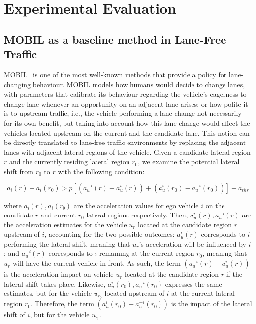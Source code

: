 \section{Experimental Evaluation}\label{sec:exp_eval2}



\subsection{MOBIL as a baseline method in Lane-Free Traffic}

MOBIL~\cite{kesting2007mobil} is one of the most well-known  methods that provide a policy for lane-changing behaviour.
MOBIL models how humans would decide to change lanes, with parameters that calibrate its behaviour regarding the vehicle's eagerness to change lane whenever an opportunity on an adjacent lane arises; or how polite it is to upstream traffic, i.e., the vehicle performing a lane change not necessarily for its own benefit, but taking into account how this lane-change would affect the vehicles located upstream on the current and the candidate lane.
This notion can be directly translated to lane-free traffic environments by replacing the adjacent lanes with adjacent lateral regions of the vehicle. 
Given a candidate lateral region $r$ and the currently residing lateral region $r_0$, we examine the potential lateral shift from $r_0$ to $r$ with the following condition:

\begin{equation}\label{eq:mobil}
    a_i(r) - a_i(r_0) > p [(a_u^{-i}(r)-a_u^i(r))+(a_u^i(r_0)-a_u^{-i}(r_0))]+ a_{thr}
\end{equation}

\noindent where $a_i(r), a_i(r_0)$ are the acceleration values for ego vehicle $i$ on the candidate $r$ and current $r_0$ lateral regions respectively. Then, $a_u^i(r),a_u^{-i}(r)$ are the acceleration estimates for the vehicle $u_r$ located at the candidate region $r$ upstream of $i$, accounting for the two possible outcomes: $a_u^i(r)$ corresponds to $i$ performing the lateral shift, meaning that $u_r$'s acceleration will be influenced by $i$; and $a_u^{-i}(r)$ corresponds to $i$ remaining at the current region $r_0$, meaning that $u_r$ will have the current vehicle in front.
As such, the term $(a_u^{-i}(r)-a_u^i(r))$ is the acceleration impact on vehicle $u_r$ located at the candidate region $r$ if the lateral shift takes place.
Likewise, $a_u^i(r_0),a_u^{-i}(r_0)$ expresses the same estimates, but for the vehicle $u_{r_0}$ located upstream of $i$ at the current lateral region $r_0$. 
Therefore, the term $(a_u^i(r_0)-a_u^{-i}(r_0))$ is the impact of the lateral shift of $i$, but for the vehicle $u_{r_0}$.

